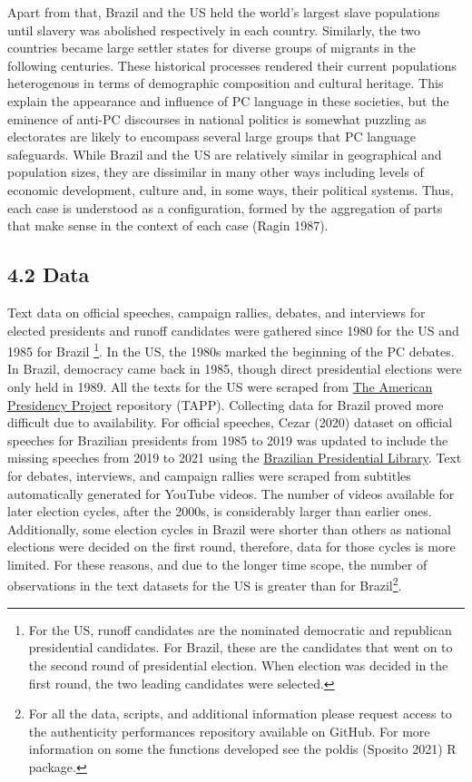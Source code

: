 \documentclass[
  12pt,
]{article}
\begin{document}
Apart from that, Brazil and the US held the world's largest slave
populations until slavery was abolished respectively in each country.
Similarly, the two countries became large settler states for diverse
groups of migrants in the following centuries. These historical
processes rendered their current populations heterogenous in terms of
demographic composition and cultural heritage. This explain the
appearance and influence of PC language in these societies, but the
eminence of anti-PC discourses in national politics is somewhat puzzling
as electorates are likely to encompass several large groups that PC
language safeguards. While Brazil and the US are relatively similar in
geographical and population sizes, they are dissimilar in many other
ways including levels of economic development, culture and, in some
ways, their political systems. Thus, each case is understood as a
configuration, formed by the aggregation of parts that make sense in the
context of each case (Ragin 1987).

\hypertarget{data}{%
\subsection{4.2 Data}\label{data}}

Text data on official speeches, campaign rallies, debates, and
interviews for elected presidents and runoff candidates were gathered
since 1980 for the US and 1985 for Brazil \footnote{For the US, runoff
  candidates are the nominated democratic and republican presidential
  candidates. For Brazil, these are the candidates that went on to the
  second round of presidential election. When election was decided in
  the first round, the two leading candidates were selected.}. In the
US, the 1980s marked the beginning of the PC debates. In Brazil,
democracy came back in 1985, though direct presidential elections were
only held in 1989. All the texts for the US were scraped from
\href{https://www.presidency.ucsb.edu}{The American Presidency Project}
repository (TAPP). Collecting data for Brazil proved more difficult due
to availability. For official speeches, Cezar (2020) dataset on official
speeches for Brazilian presidents from 1985 to 2019 was updated to
include the missing speeches from 2019 to 2021 using the
\href{http://www.biblioteca.presidencia.gov.br/sobre-a-biblioteca/biblioteca-da-presidencia-da-republica}{Brazilian
Presidential Library}. Text for debates, interviews, and campaign
rallies were scraped from subtitles automatically generated for YouTube
videos. The number of videos available for later election cycles, after
the 2000s, is considerably larger than earlier ones. Additionally, some
election cycles in Brazil were shorter than others as national elections
were decided on the first round, therefore, data for those cycles is
more limited. For these reasons, and due to the longer time scope, the
number of observations in the text datasets for the US is greater than
for Brazil\footnote{ For all the data, scripts, and additional
  information please request access to the authenticity performances
  repository available on GitHub. For more information on some the
  functions developed see the poldis (Sposito 2021) R package.}.
\end{document}
